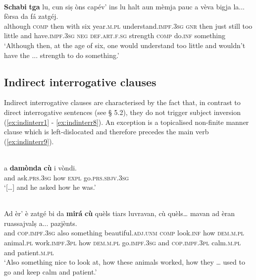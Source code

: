 \ea
\label{}
\\
\gll \textbf{Schabi} \textbf{tga} lu, cun siṣ òns capév’ ins lu halt aun mèmja pauc a vèva bigja la... fòrsa\footnotemark{} da fá zatgéj.   \\
although \textsc{comp} then with six year.\textsc{m.pl} understand.\textsc{impf.3sg} \textsc{gnr} then just still too little and have.\textsc{impf.3sg} \textsc{neg} \textsc{def.art.f.sg} strength \textsc{comp} do.\textsc{inf} something\\
\glt `Although then, at the age of six, one would understand too little and wouldn’t have the ... strength to do something.'
\z

\subsection{Indirect interrogative clauses}
Indirect interrogative clauses are characterised by the fact that, in contrast to direct interrogative sentences (see § 5.2), they do not trigger subject inversion (\ref{ex:indinterr1} - \ref{ex:indinterr8}). An exception is a topicalised non-finite manner clause which is left-dislocated and therefore precedes the main verb (\ref{ex:indinterr9}).

\ea
\label{ex:indinterr1}
 {\citealt[105]{Büchli1966}}\\
\gll    [...] a \textbf{damònda} \textbf{cù} i vòndi.\\
{} and ask.\textsc{prs.3sg} how \textsc{expl} go.\textsc{prs.sbjv.3sg}\\
\glt `[…] and he asked how he was.'
\z

\ea
\label{ex:indinterr2}
\\
\gll   Ad èr' è zatgé bi da \textbf{mirá} \textbf{cù} quèls tiars luvravan, cù quèls… mavan ad èran ruassajvalṣ a... pazjènts.\\
and \textsc{cop.impf.3sg} also something beautiful.\textsc{adj.unm} \textsc{comp} look.\textsc{inf} how \textsc{dem.m.pl} animal.\textsc{pl} work.\textsc{impf.3pl} how \textsc{dem.m.pl} go.\textsc{impf.3sg} and \textsc{cop.impf.3pl} calm.\textsc{m.pl} and patient.\textsc{m.pl}  \\
\glt `Also something nice to look at, how these animals worked, how they … used to go and keep calm and patient.'
\z

